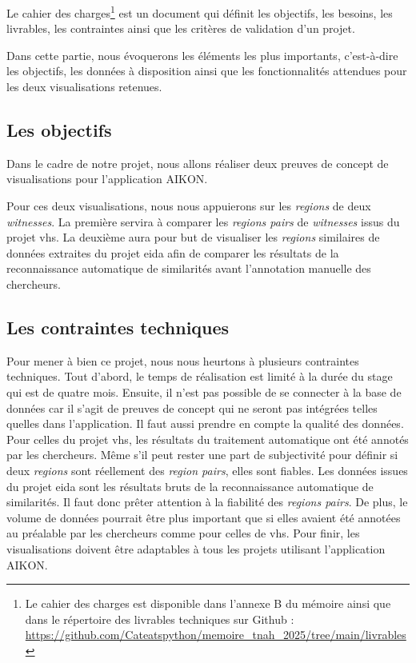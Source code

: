 Le cahier des charges\footnote{Le cahier des charges est disponible dans l'annexe B du mémoire ainsi que dans le répertoire des livrables techniques sur Github : \url{https://github.com/Cateatspython/memoire_tnah_2025/tree/main/livrables}} est un document qui définit les objectifs, les besoins, les livrables, les contraintes ainsi que les critères de validation d'un projet.  

Dans cette partie, nous évoquerons les éléments les plus importants, c'est-à-dire les objectifs, les données à disposition ainsi que les fonctionnalités attendues pour les deux visualisations retenues.

\subsection{Les objectifs}

Dans le cadre de notre projet, nous allons réaliser deux preuves de concept de visualisations pour l'application AIKON.

Pour ces deux visualisations, nous nous appuierons sur les \textit{regions} de deux \textit{witnesses}.
La première servira à comparer les \textit{regions pairs} de \textit{witnesses} issus du projet \gls{vhs}. La deuxième aura pour but de visualiser les \textit{regions} similaires de données extraites du projet \gls{eida} afin de comparer les résultats de la reconnaissance automatique de similarités avant l'annotation manuelle des chercheurs. 

\subsection{Les contraintes techniques}

Pour mener à bien ce projet, nous nous heurtons à plusieurs contraintes techniques. 
Tout d'abord, le temps de réalisation est limité à la durée du stage qui est de quatre mois.
Ensuite, il n'est pas possible de se connecter à la base de données car il s'agit de preuves de concept qui ne seront pas intégrées telles quelles dans l'application. 
Il faut aussi prendre en compte la qualité des données. Pour celles du projet \gls{vhs}, les résultats du traitement automatique ont été annotés par les chercheurs. Même s'il peut rester une part de subjectivité pour définir si deux \textit{regions} sont réellement des \textit{region pairs}, elles sont fiables. Les données issues du projet \gls{eida} sont les résultats bruts de la reconnaissance automatique de similarités. Il faut donc prêter attention à la fiabilité des \textit{regions pairs}. De plus, le volume de données pourrait être plus important que si elles avaient été annotées au préalable par les chercheurs comme pour celles de \gls{vhs}. 
Pour finir, les visualisations doivent être adaptables à tous les projets utilisant l'application AIKON.


